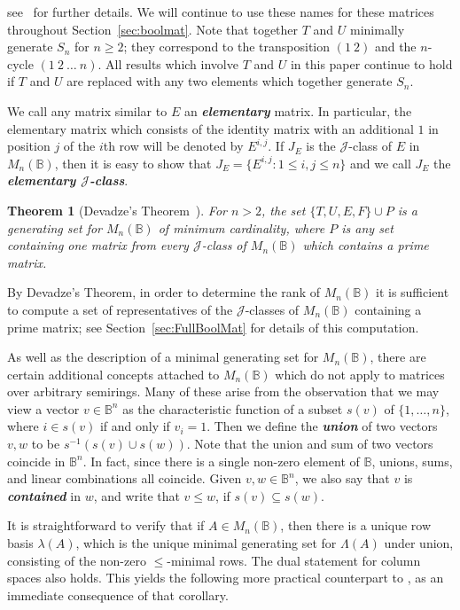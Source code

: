 \documentclass[11pt]{article}
\newtheorem{thm}{Theorem}[subsection]
\newcommand{\defn}[1]{\textbf{\textit{#1}}}
\numberwithin{equation}{section}
\newcommand{\set}[2]{\ensuremath{\{#1 : #2 \}}}
\newcommand{\B}{\mathbb{B}}
\newcommand{\Bn}{M_n(\B)}
\newcommand{\J}{\mathscr{J}}
\newcommand{\RowS}{\Lambda}
\newcommand{\RowB}{\lambda}
\begin{document}
see~\cite{Roush1977aa} for further details.
We will continue to use these names for these matrices throughout
Section~\ref{sec:boolmat}. Note that together $T$ and $U$ minimally generate
$S_n$ for $n \geq 2$; they correspond to the transposition $(1~2)$ and the
$n$-cycle $(1~2~\ldots~n)$. All results which involve $T$ and $U$ in this paper
continue to hold if $T$ and $U$ are replaced with any two elements which
together generate $S_n$.

We call any matrix similar to $E$ an \defn{elementary} matrix. In particular,
the elementary matrix which consists of the identity matrix with an additional
$1$ in position $j$ of the $i$th row will be denoted by $E^{i,j}$. If $J_E$ is
the $\J$-class of $E$ in $\Bn$, then it is easy to show that $J_E =
\set{E^{i,j}}{1 \leq i, j \leq n}$ and we call $J_E$ the \defn{elementary
  $\J$-class}. 
\begin{thm}[Devadze's Theorem~\cite{Konieczny2011aa}]
  For $n > 2$, the set $\{T, U, E, F\} \cup P$ is a generating set for $\Bn$ of
  minimum cardinality, where $P$ is any set containing one matrix from every
  $\J$-class of $\Bn$ which contains a prime matrix. 
\end{thm}
By Devadze's Theorem, in order to determine the rank of $\Bn$ it is sufficient
to compute a set of representatives of the $\J$-classes of $\Bn$ containing a
prime matrix; see Section~\ref{sec:FullBoolMat} for details of this computation.

As well as the description of a minimal generating set for $\Bn$, there are
certain additional concepts attached to $\Bn$ which do not apply to matrices
over arbitrary semirings. Many of these arise from the observation that we may
view a vector $v \in \B^n$ as the characteristic function of a subset $s(v)$ of
$\{1, \ldots, n\}$, where $i \in s(v)$ if and only if $v_i = 1$.  Then we define
the \defn{union} of two vectors $v, w$ to be $s^{-1}(s(v) \cup s(w))$. Note that
the union and sum of two vectors coincide in $\B^n$. In fact, since there is a
single non-zero element of $\B$, unions, sums, and linear combinations all
coincide. Given $v, w \in \B^n$, we also say that $v$ is \defn{contained} in
$w$, and write that $v \leq w$, if $s(v) \subseteq s(w)$.

It is straightforward to verify that if $A \in \Bn$, then there is a unique row
basis $\RowB(A)$, which is the unique minimal generating set for $\RowS(A)$
under union, consisting of the non-zero $\leq$-minimal rows. The dual statement
for column spaces also holds. This yields the following more practical
counterpart to , as an immediate consequence of
that corollary.
\end{document}
